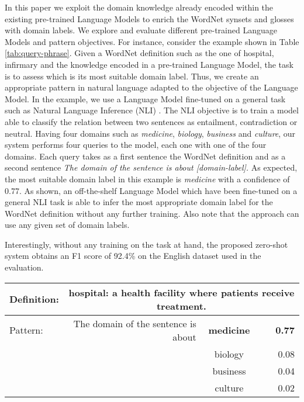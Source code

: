 \documentclass[11pt]{article}
\begin{document}
In this paper we exploit the domain knowledge already encoded within the existing pre-trained Language Models to enrich the WordNet \citep{miller1998wordnet} synsets and glosses with domain labels. We explore and evaluate different pre-trained Language Models and pattern objectives. For instance, consider the example shown in Table \ref{tab:query-phrase}. Given a WordNet definition such as the one of hospital, infirmary and the knowledge encoded in a pre-trained Language Model, the task is to assess which is its most suitable domain label. Thus, we create an appropriate pattern in natural language adapted to the objective of the Language Model. In the example, we use a Language Model fine-tuned on a general task such as Natural Language Inference (NLI) \cite{bowman2015large}. The NLI objective is to train a model able to classify the relation between two sentences as entailment, contradiction or neutral. Having four domains such as {\it medicine}, {\it biology}, {\it business} and {\it culture}, our system performs four queries to the model, each one with one of the four domains. Each query takes as a first sentence the WordNet definition and as a second sentence {\it The domain of the sentence is about [domain-label].} As expected, the most suitable domain label in this example is {\it medicine} with a confidence of 0.77. As shown, an off-the-shelf Language Model which have been fine-tuned on a general NLI task is able to infer the most appropriate domain label for the WordNet definition without any further training. Also note that the approach can use any given set of domain labels.

Interestingly, without any training on the task at hand, the proposed zero-shot system obtains an F1 score of 92.4\% on the English dataset used in the evaluation.

\begin{table*}[!ht]
    \centering
\begin{tabularx}{0.77\linewidth}{lrclr}
        \toprule
        Definition: & \multicolumn{4}{c}{hospital: a health facility where patients receive treatment.} \\
        \midrule
        Pattern: & The domain of the sentence is about & \textbf{medicine} &   & \textbf{0.77} \\
                     &                                     & biology  &   & 0.08 \\
                     &                                     & business &   & 0.04 \\
                     &                                     & culture  &   & 0.02 \\
\bottomrule
    \end{tabularx}
\caption{An example of domain labelling.}
    \label{tab:query-phrase}
\end{table*}
\end{document}
